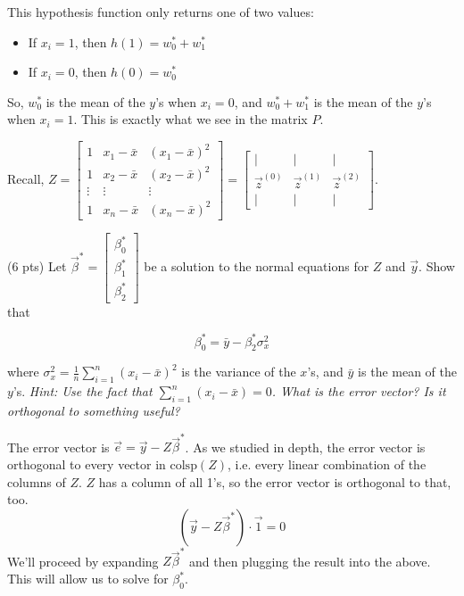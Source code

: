 \documentclass[11pt]{article}
\begin{document}
\begin{prob}
\begin{subprob}
\begin{solution}
This hypothesis function only returns one of two values:
\begin{itemize}
    \item If $x_i = 1$, then $h(1) = w_0^* + w_1^*$
    \item If $x_i = 0$, then $h(0) = w_0^*$
\end{itemize}

So, $w_0^*$ is the mean of the $y$'s when $x_i = 0$, and $w_0^* + w_1^*$ is the mean of the $y$'s when $x_i = 1$. This is exactly what we see in the matrix $P$.

\end{solution}
\end{subprob}

\newpage

Recall, $Z = \begin{bmatrix} 1 & x_1 - \bar{x} & (x_1 - \bar{x})^2 \\ 1 & x_2 - \bar{x} & (x_2 - \bar{x})^2 \\ \vdots & \vdots & \vdots \\ 1 & x_n - \bar{x} & (x_n - \bar{x})^2 \end{bmatrix} = \begin{bmatrix} | & | & | \\ \vec z^{(0)} & \vec z^{(1)} & \vec z^{(2)} \\ | & | & | \end{bmatrix}$.

\begin{subprob}(6 pts) Let $\vec \beta^* = \begin{bmatrix} \beta_0^* \\ \beta_1^* \\ \beta_2^* \end{bmatrix}$ be a solution to the normal equations for $Z$ and $\vec y$. Show that

$$\beta_0^* = \bar{y} - \beta_2^* \sigma_x^2$$

where $\sigma_x^2 = \frac{1}{n} \sum_{i=1}^n (x_i - \bar{x})^2$ is the variance of the $x$'s, and $\bar{y}$ is the mean of the $y$'s. \textit{Hint: Use the fact that $\sum_{i = 1}^n (x_i - \bar{x}) = 0$. What is the error vector? Is it orthogonal to something useful?} \\

\emptybox{16cm}

\begin{solution}
The error vector is $\vec e = \vec y - Z\vec \beta^*$. As we studied in depth, the error vector is orthogonal to every vector in $\text{colsp}(Z)$, i.e. every linear combination of the columns of $Z$. $Z$ has a column of all 1's, so the error vector is orthogonal to that, too.
$$(\vec y - Z\vec \beta^*) \cdot \vec 1 = 0$$
We'll proceed by expanding $Z \vec \beta^*$ and then plugging the result into the above. This will allow us to solve for $\beta^*_0$.


\end{solution}
\end{subprob}
\end{prob}
\end{document}
